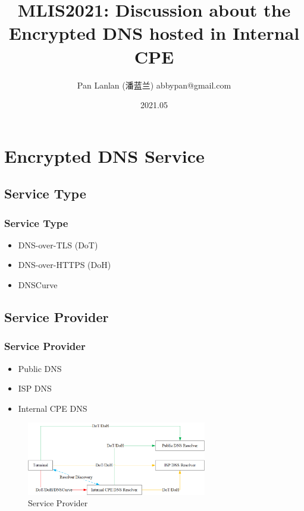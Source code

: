 \documentclass{ctexbeamer}
\title{MLIS2021: Discussion about the Encrypted DNS hosted in Internal CPE}
\author{Pan Lanlan (潘蓝兰) \newline  \newline abbypan@gmail.com}
\institute[China]{Guangdong OPPO Mobile Telecommunications Corp. Ltd., China}
\date{2021.05}
\begin{document}
\frame{\titlepage}

\frame{\tableofcontents}
\clearpage

\section{Encrypted DNS Service}

\subsection{Service Type}
\begin{frame}
\frametitle{Service Type}

    \begin{itemize}
            \item DNS-over-TLS (DoT)  
            \item DNS-over-HTTPS (DoH)
            \item DNSCurve
    \end{itemize}

\end{frame}

\subsection{Service Provider}
\begin{frame}
\frametitle{Service Provider}

\begin{itemize}
    \item Public DNS
    \item ISP DNS
    \item Internal CPE DNS
\end{itemize}

    \begin{figure}[H]
        \centering 
        \includegraphics[width=0.7\textwidth]{pic/service_provider.png} 
        \caption{Service Provider} 
        \label{fig.service_provider}
    \end{figure}

    \end{frame}
\end{document}
